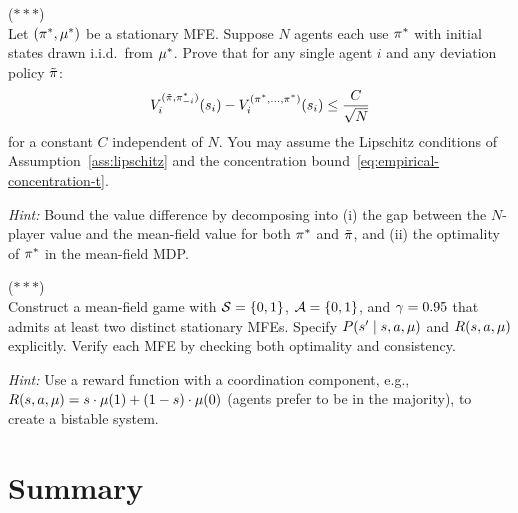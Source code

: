 \documentclass[11pt,a4paper]{article}
\begin{document}
\begin{exercise}
\textnormal{(\(***\))} \\
Let $(\pi^*, \mu^*)$ be a stationary MFE.  Suppose
$N$ agents each use $\pi^*$ with initial states drawn i.i.d.\
from $\mu^*$.  Prove that for any single agent $i$ and any
deviation policy $\tilde{\pi}$:
\[
  V_i^{(\tilde{\pi}, \pi_{-i}^*)}(s_i)
  - V_i^{(\pi^*, \ldots, \pi^*)}(s_i)
  \leq \frac{C}{\sqrt{N}}
\]
for a constant $C$ independent of $N$.  You may assume the
Lipschitz conditions of Assumption~\ref{ass:lipschitz} and the
concentration bound~\eqref{eq:empirical-concentration-t}.

\textit{Hint:} Bound the value difference by decomposing into (i)
the gap between the $N$-player value and the mean-field value for
both $\pi^*$ and $\tilde{\pi}$, and (ii) the optimality of
$\pi^*$ in the mean-field MDP.
\end{exercise}

\begin{exercise}
\textnormal{(\(***\))} \\
Construct a mean-field game with $\mathcal{S} = \{0, 1\}$, $\mathcal{A} =
\{0, 1\}$, and $\gamma = 0.95$ that admits at least two distinct
stationary MFEs.  Specify $P(s' \mid s, a, \mu)$ and
$R(s, a, \mu)$ explicitly.  Verify each MFE by checking both
optimality and consistency.

\textit{Hint:} Use a reward function with a coordination component,
e.g., $R(s, a, \mu) = s \cdot \mu(1) + (1-s) \cdot
\mu(0)$ (agents prefer to be in the majority), to create a
bistable system.
\end{exercise}


\section{Summary}
\label{sec:summary}
\end{document}
